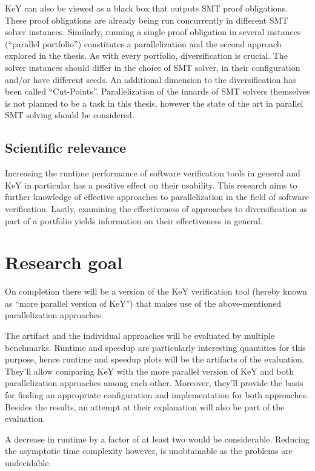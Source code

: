 \documentclass{scrartcl}
\begin{document}
KeY can also be viewed as a black box that outputs SMT proof obligations.
These proof obligations are already being run concurrently in different SMT solver instances.
Similarly, running a single proof obligation in several instances (\enquote{parallel portfolio})
constitutes a parallelization and the second approach explored in the thesis.
As with every portfolio, diversification is crucial.
The solver instances should differ in the choice of SMT solver,
in their configuration and/or have different seeds.
An additional dimension to the diversification has been called \enquote{Cut-Points}.
Parallelization of the innards of SMT solvers themselves is not planned to be a task in this thesis,
however the state of the art in parallel SMT solving should be considered.

\subsection{Scientific relevance}
Increasing the runtime performance of software verification tools in general and KeY in particular
has a positive effect on their usability.
This research aims to further knowledge of effective approaches to parallelization
in the field of software verification.
Lastly, examining the effectiveness of approaches to diversification as part of a portfolio
yields information on their effectiveness in general.

\section{Research goal}
On completion there will be a version of the KeY verification tool
(hereby known as \enquote{more parallel version of KeY})
that makes use of the above-mentioned parallelization approaches.

The artifact and the individual approaches will be evaluated by multiple benchmarks.
Runtime and speedup are particularly interesting quantities for this purpose,
hence runtime and speedup plots will be the artifacts of the evaluation.
They'll allow comparing KeY with the more parallel version of KeY and
both parallelization approaches among each other.
Moreover, they'll provide the basis for finding an appropriate configuration
and implementation for both approaches.
Besides the results, an attempt at their explanation will also be part of the evaluation.

A decrease in runtime by a factor of at least two would be considerable.
Reducing the asymptotic time complexity however, is unobtainable
as the problems are undecidable.
\end{document}
